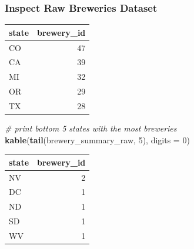 \documentclass[]{article}
\newenvironment{Shaded}{\begin{snugshade}}{\end{snugshade}}
\newcommand{\KeywordTok}[1]{\textcolor[rgb]{0.13,0.29,0.53}{\textbf{#1}}}
\newcommand{\DataTypeTok}[1]{\textcolor[rgb]{0.13,0.29,0.53}{#1}}
\newcommand{\DecValTok}[1]{\textcolor[rgb]{0.00,0.00,0.81}{#1}}
\newcommand{\StringTok}[1]{\textcolor[rgb]{0.31,0.60,0.02}{#1}}
\newcommand{\CommentTok}[1]{\textcolor[rgb]{0.56,0.35,0.01}{\textit{#1}}}
\newcommand{\OperatorTok}[1]{\textcolor[rgb]{0.81,0.36,0.00}{\textbf{#1}}}
\newcommand{\NormalTok}[1]{#1}
\begin{document}
\subsubsection{Inspect Raw Breweries
Dataset}\label{inspect-raw-breweries-dataset}

\begin{Shaded}
\end{Shaded}

\begin{longtable}[]{@{}lr@{}}
\toprule
state & brewery\_id\tabularnewline
\midrule
\endhead
CO & 47\tabularnewline
CA & 39\tabularnewline
MI & 32\tabularnewline
OR & 29\tabularnewline
TX & 28\tabularnewline
\bottomrule
\end{longtable}

\begin{Shaded}
\begin{Highlighting}[]
\CommentTok{# print bottom 5 states with the most breweries}
\KeywordTok{kable}\NormalTok{(}\KeywordTok{tail}\NormalTok{(brewery_summary_raw, }\DecValTok{5}\NormalTok{), }\DataTypeTok{digits =} \DecValTok{0}\NormalTok{)}
\end{Highlighting}
\end{Shaded}

\begin{longtable}[]{@{}lr@{}}
\toprule
state & brewery\_id\tabularnewline
\midrule
\endhead
NV & 2\tabularnewline
DC & 1\tabularnewline
ND & 1\tabularnewline
SD & 1\tabularnewline
WV & 1\tabularnewline
\bottomrule
\end{longtable}
\end{document}
